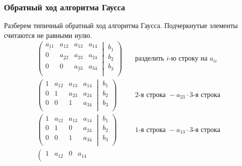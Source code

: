 \documentclass{article}
\begin{document}
\subsubsection*{Обратный ход алгоритма Гаусса}
Разберем типичный обратный ход алгоритма Гаусса. Подчеркнутые элементы считаются не равными нулю.
\begin{align*}
	\left(\left.
	\begin{matrix}
		\underline{a_{11}}& a_{12}&a_{13}& a_{14}\\
		0& \underline{a_{22}}&a_{23}& a_{24}\\
		0& 0&\underline{a_{33}}& a_{34}\\
	\end{matrix}
	\:\right|\:
	\begin{matrix}
		b_1\\
		b_2\\
		b_3\\
	\end{matrix}
	\right)&
	\quad \text{разделить }i\text{-ю строку на }a_{ii}\\
	\left(\left.
	\begin{matrix}
		1& a_{12}&a_{13}& a_{14}\\
		0& 1&a_{23}& a_{24}\\
		0& 0&1& a_{34}\\
	\end{matrix}
	\:\right|\:
	\begin{matrix}
		b_1\\
		b_2\\
		b_3\\
	\end{matrix}
	\right)&
	\quad 2\text{-я строка }-a_{23}\cdot3\text{-я строка}\\
	\left(\left.
	\begin{matrix}
		1& a_{12}&a_{13}& a_{14}\\
		0& 1&0& a_{24}\\
		0& 0&1& a_{34}\\
	\end{matrix}
	\:\right|\:
	\begin{matrix}
		b_1\\
		b_2\\
		b_3\\
	\end{matrix}
	\right)&
	\quad 1\text{-я строка }-a_{13}\cdot3\text{-я строка}\\
	\left(\left.
	\begin{matrix}
		1& a_{12}&0& a_{14}\\

\end{matrix}
\end{align*}
\end{document}
